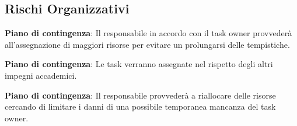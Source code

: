	\subsection{Rischi Organizzativi}

		\def\productquality{
    			{
        			Calcolo
				Tempistiche e Costi
				RO1,
        			Causa RT1 le valutazioni sulle tempistiche e i costi economici potrebbero essere imprecisi, 
        			Vengono predisposte delle tabelle sulle tempistiche e sarà compito del responsabile monitorare l'andamento dello sviluppo,
        			Occorrenza: Alta 
				Pericolosità: Alta
    			},
		}
		
		\textbf{Piano di contingenza}: Il responsabile in accordo con il task owner provvederà all'assegnazione di maggiori risorse per evitare un prolungarsi delle tempistiche.
		\def\productquality{
			{
        			Impegni
				Accademici
				RO2,
        			Il periodo di sviluppo del progetto inizia a ridosso della sessione d'esami universitaria a cui tutti i membri del gruppo si vedono impegnati in diverse occasioni, 
        			In sede di riunione il team ha deciso di condividere i periodi di tempo in cui il loro contributo al progetto potrebbe calare o venir meno,
        			Occorrenza: Media 
				Pericolosità: Media
    			},
		}
		
		\textbf{Piano di contingenza}: Le task verranno assegnate nel rispetto degli altri impegni accademici.
		\pagebreak
		\def\productquality{
			{
        			Impegni
				Personali
				RO3,
        			è possibile il verificarsi di imprevisti personali che potrebbero influire nel corretto sviluppo del progetto, 
        			è compito di ogni membro del gruppo segnalare un eventuale imprevisto al responsabile del gruppo in modo da permettergli di riorganizzare l'agenda,
        			Occorrenza: Bassa 
				Pericolosità: Bassa
    			},
		}
		
		\textbf{Piano di contingenza}: Il responsabile provvederà a riallocare delle risorse cercando di limitare i danni di una possibile temporanea mancanza del task owner.

